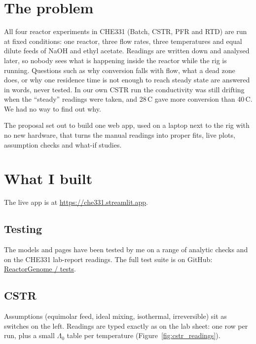 \documentclass[11pt,a4paper]{article}
\begin{document}
\section{The problem}

All four reactor experiments in CHE331 (Batch, CSTR, PFR and RTD) are run at fixed conditions: one reactor, three flow
rates, three temperatures and equal dilute feeds of NaOH and ethyl acetate. Readings are written down and analysed
later, so nobody sees what is happening inside the reactor while the rig is running. Questions such as why conversion
falls with flow, what a dead zone does, or why one residence time is not enough to reach steady state are answered in
words, never tested. In our own CSTR run the conductivity was still drifting when the ``steady'' readings were taken, and
28\,\textdegree C gave more conversion than 40\,\textdegree C. We had no way to find out why.

The proposal set out to build one web app, used on a laptop next to the rig with no new hardware, that turns the
manual readings into proper fits, live plots, assumption checks and what-if studies.

\section{What I built}

The live app is at \url{https://che331.streamlit.app}.

\subsection{Testing}

The models and pages have been tested by me on a range of analytic checks and on the CHE331 lab-report readings.
The full test suite is on GitHub:
\href{https://github.com/Mayurdp2403/ReactorGenome/tree/main/tests}{ReactorGenome / tests}.

\subsection{CSTR}

Assumptions (equimolar feed, ideal mixing, isothermal, irreversible) sit as switches on the left. Readings are typed
exactly as on the lab sheet: one row per run, plus a small $\Lambda_0$ table per temperature
(Figure~\ref{fig:cstr_readings}).
\end{document}
